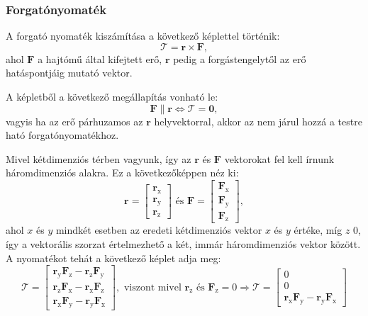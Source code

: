 \documentclass[12pt]{report}
\begin{document}
\subsubsection{Forgatónyomaték}

A forgató nyomaték kiszámítása a következő képlettel történik:
\[
    \mathcal{T} = \mathbf{r} \times \mathbf{F},
\]
ahol $\mathbf{F}$ a hajtómű által kifejtett erő, $\mathbf{r}$ pedig a forgástengelytől az erő hatáspontjáig mutató vektor.

A képletből a következő megállapítás vonható le:
\[
    \mathbf{F} \parallel \mathbf{r} \Leftrightarrow \mathcal{T} = \mathbf{0},
\]
vagyis ha az erő párhuzamos az $\mathbf{r}$ helyvektorral, akkor az nem járul hozzá a testre ható forgatónyomatékhoz.

Mivel kétdimenziós térben vagyunk, így az $\mathbf{r}$ és $\mathbf{F}$ vektorokat fel kell írnunk háromdimenziós alakra. Ez a következőképpen néz ki:
\[
    \mathbf{r} =
    \begin{bmatrix}
        \mathbf{r}_{\text{x}} \\
        \mathbf{r}_{\text{y}} \\
        \mathbf{r}_{\text{z}}
    \end{bmatrix}
    \text{ és }
    \mathbf{F} =
    \begin{bmatrix}
        \mathbf{F}_{\text{x}} \\
        \mathbf{F}_{\text{y}} \\
        \mathbf{F}_{\text{z}}
    \end{bmatrix},
\]
ahol $x$ és $y$ mindkét esetben az eredeti kétdimenziós vektor $x$ és $y$ értéke, míg $z$ 0, így a vektorális szorzat értelmezhető a két, immár háromdimenziós vektor között.
A nyomatékot tehát a következő képlet adja meg:
\[
    \mathcal{T} =
    \begin{bmatrix}
        \mathbf{r}_{\text{y}} \mathbf{F}_{\text{z}} - \mathbf{r}_{\text{z}} \mathbf{F}_{\text{y}} \\
        \mathbf{r}_{\text{z}} \mathbf{F}_{\text{x}} - \mathbf{r}_{\text{x}} \mathbf{F}_{\text{z}} \\
        \mathbf{r}_{\text{x}} \mathbf{F}_{\text{y}} - \mathbf{r}_{\text{y}} \mathbf{F}_{\text{x}}
    \end{bmatrix},
    \text{ viszont mivel } \mathbf{r}_{\text{z}} \text{ és } \mathbf{F}_{\text{z}} = 0 \Rightarrow
    \mathcal{T} =
    \begin{bmatrix}
        0 \\
        0 \\
        \mathbf{r}_{\text{x}} \mathbf{F}_{\text{y}} - \mathbf{r}_{\text{y}} \mathbf{F}_{\text{x}}
    \end{bmatrix}
\]
\end{document}
